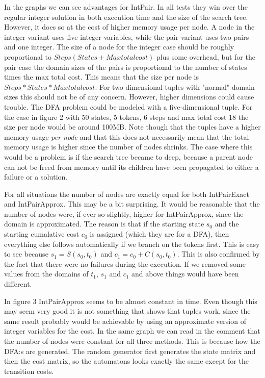 \documentclass[a4paper,11pt]{article}
\begin{document}


In the graphs we can see advantages for IntPair. In all tests they win over the regular integer solution in both execution time and the size of the search tree. However, it does so at the cost of higher memory usage per node. A node in the integer variant uses five integer variables, while the pair variant uses two pairs and one integer. The size of a node for the integer case should be roughly proportional to $Steps(States + Maxtotalcost)$ plus some overhead, but for the pair case the domain sizes of the pairs is proportional to the number of states times the max total cost. This means that the size per node is $Steps*States*Maxtotalcost$. For two-dimensional tuples with "normal" domain sizes this should not be of any concern. However, higher dimensions could cause trouble. The DFA problem could be modeled with a five-dimensional tuple. For the case in figure 2 with 50 states, 5 tokens, 6 steps and max total cost 18 the size per node would be around 100MB. Note though that the tuples have a higher memory usage \textit{per node} and that this does not necessarily mean that the total memory usage is higher since the number of nodes shrinks. The case where this would be a problem is if the search tree became to deep, because a parent node can not be freed from memory until its children have been propagated to either a failure or a solution.

For all situations the number of nodes are exactly equal for both IntPairExact and IntPairApprox. This may be a bit surprising. It would be reasonable that the number of nodes were, if ever so slightly, higher for IntPairApprox, since the domain is approximated. The reason is that if the starting state $s_0$ and the starting cumalative cost $c_0$ is assigned (which they are for a DFA), then everything else follows automatically if we branch on the tokens first. This is easy to see because $s_1=S(s_0, t_0)$ and $c_1=c_0+C(s_0, t_0)$. This is also confirmed by the fact that there were no failures during the execution. If we removed some values from the domains of $t_1$, $s_1$ and $c_1$ and above things would have been different. 

In figure 3 IntPairApprox seems to be almost constant in time. Even though this may seem very good it is not something that shows that tuples work, since the same result probably would be achievable by using an approximate version of integer variables for the cost. In the same graph we can read in the comment that the number of nodes were constant for all three methods. This is because how the DFA:s are generated. The random generator first generates the state matrix and then the cost matrix, so the automatons looks exactly the same except for the transition costs.
\end{document}
